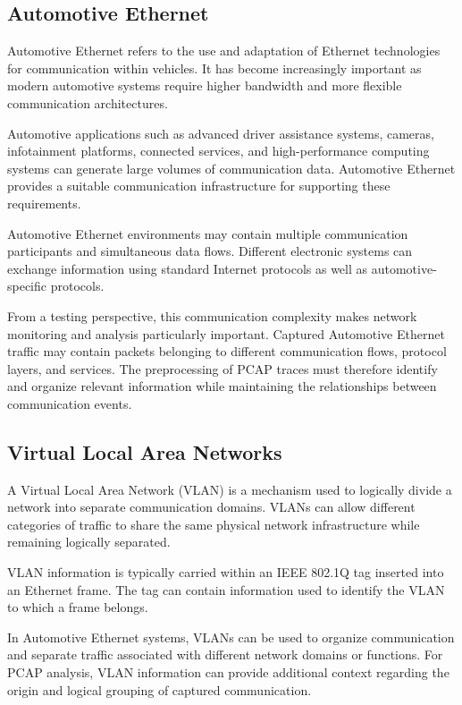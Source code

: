 \subsection{Automotive Ethernet}

Automotive Ethernet refers to the use and adaptation of Ethernet technologies for communication within vehicles. It has become increasingly important as modern automotive systems require higher bandwidth and more flexible communication architectures.

Automotive applications such as advanced driver assistance systems, cameras, infotainment platforms, connected services, and high-performance computing systems can generate large volumes of communication data. Automotive Ethernet provides a suitable communication infrastructure for supporting these requirements.

Automotive Ethernet environments may contain multiple communication participants and simultaneous data flows. Different electronic systems can exchange information using standard Internet protocols as well as automotive-specific protocols.

From a testing perspective, this communication complexity makes network monitoring and analysis particularly important. Captured Automotive Ethernet traffic may contain packets belonging to different communication flows, protocol layers, and services. The preprocessing of PCAP traces must therefore identify and organize relevant information while maintaining the relationships between communication events.

\subsection{Virtual Local Area Networks}

A Virtual Local Area Network (VLAN) is a mechanism used to logically divide a network into separate communication domains. VLANs can allow different categories of traffic to share the same physical network infrastructure while remaining logically separated.

VLAN information is typically carried within an IEEE 802.1Q tag inserted into an Ethernet frame. The tag can contain information used to identify the VLAN to which a frame belongs.

In Automotive Ethernet systems, VLANs can be used to organize communication and separate traffic associated with different network domains or functions. For PCAP analysis, VLAN information can provide additional context regarding the origin and logical grouping of captured communication.

